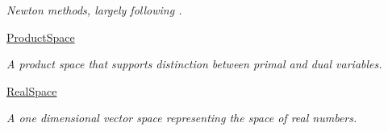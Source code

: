 \begin{DoxyCompactItemize}
\begin{DoxyCompactList}\small\item\em Newton methods, largely following \cite{Deuflhard2004}. \end{DoxyCompactList}\item 
 \hyperlink{namespaceSpacy_1_1ProductSpace}{Product\+Space}
\begin{DoxyCompactList}\small\item\em A product space that supports distinction between primal and dual variables. \end{DoxyCompactList}\item 
 \hyperlink{namespaceSpacy_1_1RealSpace}{Real\+Space}
\begin{DoxyCompactList}\small\item\em A one dimensional vector space representing the space of real numbers. \end{DoxyCompactList}\end{DoxyCompactItemize}

